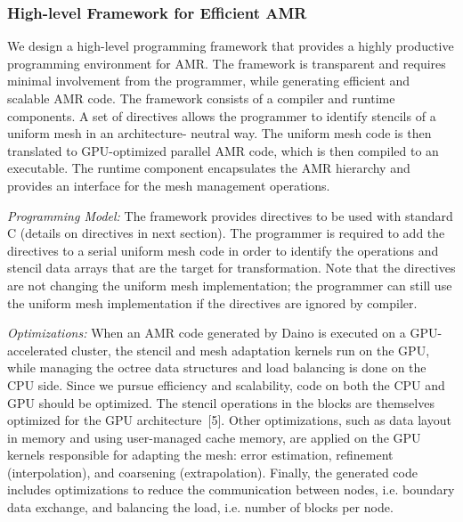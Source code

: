 \documentclass{book}
\begin{document}
\subsubsection{High-level Framework for Efficient AMR}
We design a high-level programming framework that provides a highly productive programming environment for AMR. The framework is transparent and requires minimal involvement from the programmer, while generating efficient and scalable AMR code. The framework consists of a compiler and runtime components. A set of directives allows the programmer to identify stencils of a uniform mesh in an architecture- neutral way. The uniform mesh code is then translated to GPU-optimized parallel AMR code, which is then compiled to an executable. The runtime component encapsulates the AMR hierarchy and provides an interface for the mesh management operations.

\emph{Programming Model:} The framework provides directives to be used with standard C (details on directives in next section). The programmer is required to add the directives to a serial uniform mesh code in order to identify the operations and stencil data arrays that are the target for transformation. Note that the directives are not changing the uniform mesh implementation; the programmer can still use the uniform mesh implementation if the directives are ignored by compiler.

\emph{Optimizations:} When an AMR code generated by Daino is executed on a GPU-accelerated cluster, the stencil and mesh adaptation kernels run on the GPU, while managing the octree data structures and load balancing is done on the CPU side. Since we pursue efficiency and scalability, code on both the CPU and GPU should be optimized. The stencil operations in the blocks are themselves optimized for the GPU architecture~[5]. Other optimizations, such as data layout in memory and using user-managed cache memory, are applied on the GPU kernels responsible for adapting the mesh: error estimation, refinement (interpolation), and coarsening (extrapolation). Finally, the generated code includes optimizations to reduce the communication between nodes, i.e. boundary data exchange, and balancing the load, i.e. number of blocks per node.
\end{document}
